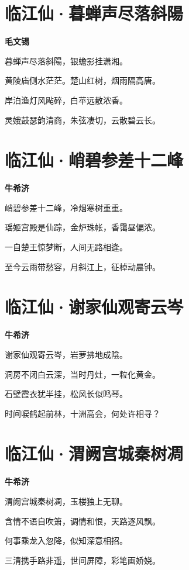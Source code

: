\documentclass[12pt,a4paper]{ctexbook}
\begin{document}
\section{临江仙·暮蝉声尽落斜陽}
\textbf{毛文锡}\par\vspace{0.5em}
暮蝉声尽落斜陽，银蟾影挂潇湘。\par
黄陵庙侧水茫茫。楚山红树，烟雨隔高唐。\par
岸泊渔灯风飐碎，白苹远散浓香。\par
灵娥鼓瑟韵清商，朱弦凄切，云散碧云长。\par

\section{临江仙·峭碧参差十二峰}
\textbf{牛希济}\par\vspace{0.5em}
峭碧参差十二峰，冷烟寒树重重。\par
瑶姬宫殿是仙踪，金炉珠帐，香霭昼偏浓。\par
一自楚王惊梦断，人间无路相逢。\par
至今云雨带愁容，月斜江上，征棹动晨钟。\par

\section{临江仙·谢家仙观寄云岑}
\textbf{牛希济}\par\vspace{0.5em}
谢家仙观寄云岑，岩萝拂地成陰。\par
洞房不闭白云深，当时丹灶，一粒化黄金。\par
石壁霞衣犹半挂，松风长似鸣琴。\par
时间唳鹤起前林，十洲高会，何处许相寻？\par

\section{临江仙·渭阙宫城秦树凋}
\textbf{牛希济}\par\vspace{0.5em}
渭阙宫城秦树凋，玉楼独上无聊。\par
含情不语自吹箫，调情和恨，天路逐风飘。\par
何事乘龙入忽降，似知深意相招。\par
三清携手路非遥，世间屏障，彩笔画娇娆。\par
\end{document}
